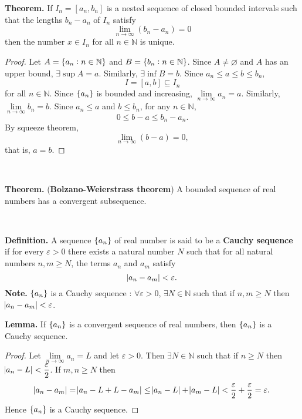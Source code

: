 \documentclass[12pt,a4paper]{article}
\newcommand{\dispsty}{\displaystyle}
\begin{document}
\begin{tcolorbox}[colback=white]
	\textbf{Theorem.} If $I_n=[a_n,b_n]$ is a nested sequence of closed bounded intervals such that the lengths $b_n-a_n$ of $I_n$ satisfy \[
	\lim\limits_{n\to\infty}(b_n-a_n)=0
	\] then the number $x\in I_n$ for all $n\in\mathbb{N}$ is unique.\tcblower\begin{proof}
		Let $A=\set{a_n:n\in\mathbb{N}}$ and $B=\set{b_n:n\in\mathbb{N}}$. Since $A\neq\varnothing$ and $A$ has an upper bound, $\exists\sup A=a$. Similarly, $\exists\inf B=b$. Since $a_n\leq a\leq b\leq b_n$, \[
		I=[a,b]\subseteq I_n
		\] for all $n\in\mathbb{N}$. Since $\set{a_n}$ is bounded and increasing, $\lim\limits_{n\to\infty}a_n=a$. Similarly, $\lim\limits_{n\to\infty}b_n=b$. Since $a_n\leq a$ and $b\leq b_n$, for any $n\in\mathbb{N}$, \[
		0\leq b-a\leq b_n-a_n.
		\] By squeeze theorem, \[
		\lim\limits_{n\to\infty}(b-a)=0,
		\] that is, $a=b$.
	\end{proof}
\end{tcolorbox}
\
\begin{tcolorbox}[colback=white]
	\textbf{Theorem.} (\textbf{Bolzano-Weierstrass theorem}) A bounded sequence of real numbers has a convergent subsequence.
\end{tcolorbox}
\
\begin{tcolorbox}[colback=white]
	\textbf{Definition.} A sequence $\set{a_n}$ of real number is said to be a \textbf{Cauchy sequence} if for every $\varepsilon>0$ there exists a natural number $N$ such that for all natural numbers $n,m\geq N$, the terms $a_n$ and $a_m$ satisfy \[
	\abs{a_n-a_m}<\varepsilon.
	\]\tcblower
	\textbf{Note.} $\set{a_n}$ is a Cauchy sequence : $\forall\varepsilon>0$, $\exists N\in\mathbb{N}$ such that if $n,m\geq N$ then $\abs{a_n-a_m}<\varepsilon$.
\end{tcolorbox}
\newpage
\begin{tcolorbox}[colback=white]
	\hypertarget{cauchyLemma}{}\textbf{Lemma.} If $\set{a_n}$ is a convergent sequence of real numbers, then $\set{a_n}$ is a Cauchy sequence. \tcblower\begin{proof}
		Let $\lim\limits_{n\to\infty}a_n=L$ and let $\varepsilon>0$. Then $\exists N\in\mathbb{N}$ such that if $n\geq N$ then $\abs{a_n-L}<\dispsty\frac{\varepsilon}{2}$. If $m,n\geq N$ then \[
		\abs{a_n-a_m} = \abs{a_n-L+L-a_m}\leq\abs{a_n-L}+\abs{a_m-L}<\frac{\varepsilon}{2}+\frac{\varepsilon}{2}=\varepsilon.
		\] Hence $\set{a_n}$ is a Cauchy sequence.
	\end{proof}
\end{tcolorbox}
\end{document}
